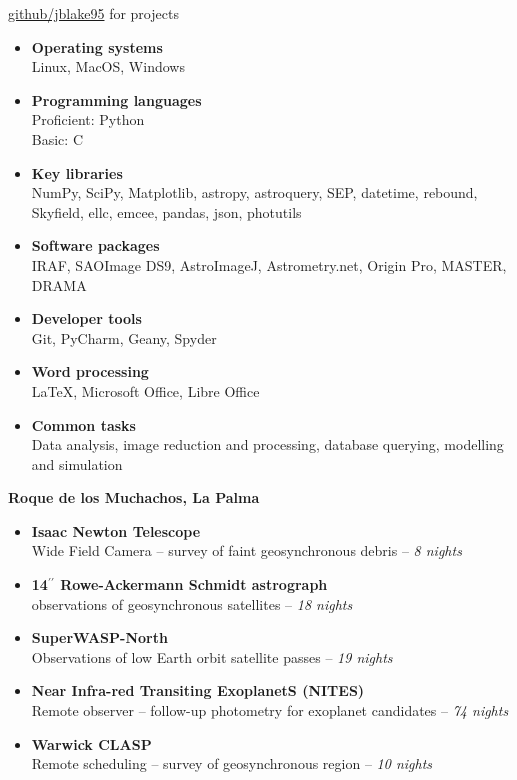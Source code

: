 
\small \faGithub \hspace{2pt} \href{https://github.com/jblake95}{github/jblake95} for projects
\smallskip
\begin{itemize}
	\item \textbf{Operating systems} \\
	Linux, MacOS, Windows
	\item \textbf{Programming languages} \\
	Proficient: Python \\
	Basic: C
	\item \textbf{Key libraries} \\
	NumPy, SciPy, Matplotlib, astropy, astroquery, SEP, datetime, rebound, Skyfield, ellc, emcee, pandas, json, photutils
	\item \textbf{Software packages} \\
	IRAF, SAOImage DS9, AstroImageJ, Astrometry.net, Origin Pro, MASTER, DRAMA
	\item \textbf{Developer tools} \\
	Git, PyCharm, Geany, Spyder
	\item \textbf{Word processing} \\
	\LaTeX, Microsoft Office, Libre Office
	\item \textbf{Common tasks} \\
	Data analysis, image reduction and processing, database querying, modelling and simulation
\end{itemize}

\medskip


\normalsize \textbf{Roque de los Muchachos, La Palma}

\medskip

\begin{itemize}
	\item \small \textbf{Isaac Newton Telescope} \\
	Wide Field Camera -- survey of faint geosynchronous debris -- \textit{8 nights} 
	\item \small \textbf{14$^{\prime\prime}$ Rowe-Ackermann Schmidt astrograph} \\
	observations of geosynchronous satellites -- \textit{18 nights}
	\item \small \textbf{SuperWASP-North} \\ Observations of low Earth orbit satellite passes -- \textit{19 nights}
	\item \small \textbf{Near Infra-red Transiting ExoplanetS (NITES)} \\
	Remote observer -- follow-up photometry for exoplanet candidates -- \textit{74 nights}
	\item \small \textbf{Warwick CLASP} \\
	Remote scheduling -- survey of geosynchronous region -- \textit{10 nights}
\end{itemize}


